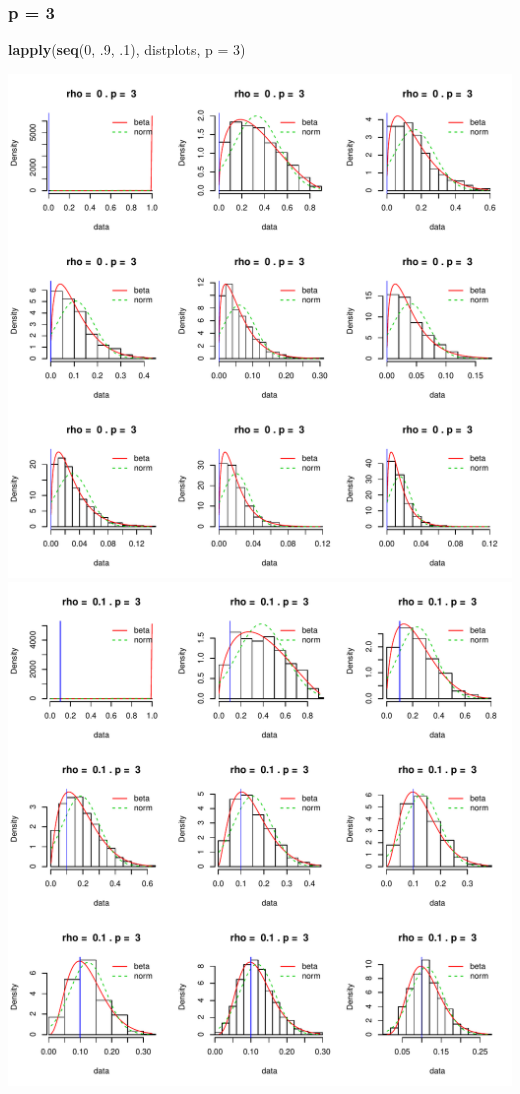 \documentclass[]{article}
\newenvironment{Shaded}{\begin{snugshade}}{\end{snugshade}}
\newcommand{\KeywordTok}[1]{\textcolor[rgb]{0.13,0.29,0.53}{\textbf{{#1}}}}
\newcommand{\DataTypeTok}[1]{\textcolor[rgb]{0.13,0.29,0.53}{{#1}}}
\newcommand{\DecValTok}[1]{\textcolor[rgb]{0.00,0.00,0.81}{{#1}}}
\newcommand{\NormalTok}[1]{{#1}}
\begin{document}
\subsubsection{p = 3}\label{p-3}

\begin{Shaded}
\begin{Highlighting}[]
\KeywordTok{lapply}\NormalTok{(}\KeywordTok{seq}\NormalTok{(}\DecValTok{0}\NormalTok{, .}\DecValTok{9}\NormalTok{, .}\DecValTok{1}\NormalTok{), distplots, }\DataTypeTok{p =} \DecValTok{3}\NormalTok{)}
\end{Highlighting}
\end{Shaded}

\includegraphics{2016_w09_files/figure-latex/unnamed-chunk-15-1.pdf}
\includegraphics{2016_w09_files/figure-latex/unnamed-chunk-15-2.pdf}
\end{document}
